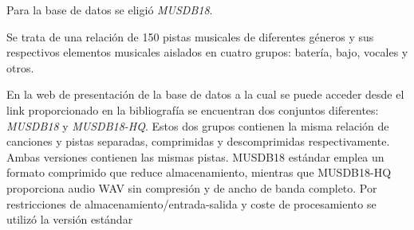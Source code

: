 Para la base de datos se eligió \textit{MUSDB18}\cite{musdb18}.

Se trata de una relación de 150 pistas musicales de diferentes géneros y sus respectivos elementos musicales aislados en cuatro grupos: batería, bajo, vocales y otros.

En la web de presentación de la base de datos a la cual se puede acceder desde el link proporcionado en la bibliografía se encuentran dos conjuntos diferentes: \textit{MUSDB18} y \textit{MUSDB18-HQ}. Estos dos grupos contienen
la misma relación de canciones y pistas separadas, comprimidas y descomprimidas respectivamente. Ambas versiones contienen las mismas pistas. MUSDB18 estándar emplea un formato comprimido que reduce almacenamiento, mientras que MUSDB18-HQ proporciona audio WAV sin compresión y de ancho de banda completo. Por restricciones de almacenamiento/entrada-salida y coste de procesamiento se utilizó la versión estándar
